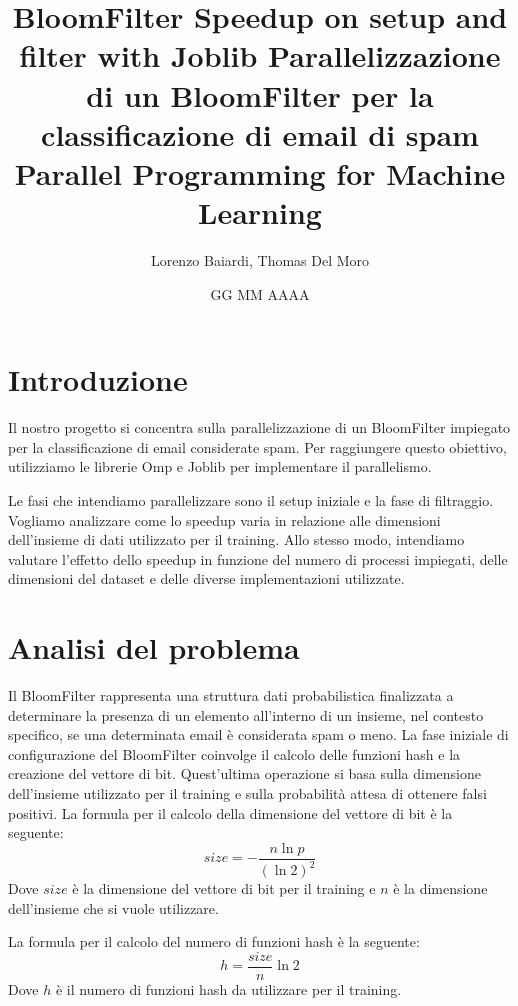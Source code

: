 \documentclass[11pt]{article}
\title{BloomFilter Speedup on setup and filter with Joblib}
\title{%
  Parallelizzazione di un BloomFilter per la classificazione di email di spam \\
  \large Parallel Programming for Machine Learning}
\author{Lorenzo Baiardi, Thomas Del Moro}
\date{GG MM AAAA}
\begin{document}
    \maketitle
    \clearpage

    \section{Introduzione}\label{sec:introduzione}
    Il nostro progetto si concentra sulla parallelizzazione di un BloomFilter impiegato per la classificazione di email considerate spam.
    Per raggiungere questo obiettivo, utilizziamo le librerie Omp e Joblib per implementare il parallelismo.

    Le fasi che intendiamo parallelizzare sono il setup iniziale e la fase di filtraggio.
    Vogliamo analizzare come lo speedup varia in relazione alle dimensioni dell'insieme di dati utilizzato per il training.
    Allo stesso modo, intendiamo valutare l'effetto dello speedup in funzione del numero di processi impiegati, delle dimensioni del dataset
    e delle diverse implementazioni utilizzate.

    \section{Analisi del problema}\label{sec:analisi-del-problema}
    Il BloomFilter rappresenta una struttura dati probabilistica finalizzata a determinare la presenza di un elemento all'interno di un insieme,
    nel contesto specifico, se una determinata email è considerata spam o meno.
    La fase iniziale di configurazione del BloomFilter coinvolge il calcolo delle funzioni hash e la creazione del vettore di bit.
    Quest'ultima operazione si basa sulla dimensione dell'insieme utilizzato per il training e sulla probabilità attesa di ottenere falsi positivi.
    La formula per il calcolo della dimensione del vettore di bit è la seguente:
    \begin{equation}
        size = -\frac{n \ln{p}}{(\ln{2})^2}\label{eq:dim_bit}
    \end{equation}
    Dove $size$ è la dimensione del vettore di bit per il training e $n$ è la dimensione dell'insieme che si vuole utilizzare.

    La formula per il calcolo del numero di funzioni hash è la seguente:
    \begin{equation}
        h = \frac{size}{n} \ln{2}\label{eq:num_hash}
    \end{equation}
    Dove $h$ è il numero di funzioni hash da utilizzare per il training.
\end{document}
